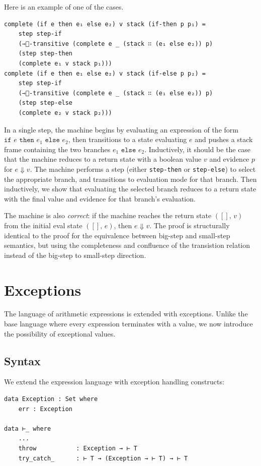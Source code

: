 Here is an example of one of the cases.
\begin{verbatim}
complete (if e then e₁ else e₂) v stack (if-then p p₁) =
    step step-𝚒𝚏
    (⇾⃰-transitive (complete e _ (stack ∷ (e₁ 𝚎𝚕𝚜𝚎 e₂)) p)
    (step step-𝚝𝚑𝚎𝚗
    (complete e₁ v stack p₁)))
complete (if e then e₁ else e₂) v stack (if-else p p₂) =
    step step-𝚒𝚏
    (⇾⃰-transitive (complete e _ (stack ∷ (e₁ 𝚎𝚕𝚜𝚎 e₂)) p)
    (step step-𝚎𝚕𝚜𝚎
    (complete e₂ v stack p₂)))
\end{verbatim}

In a single step, the machine begins by evaluating an expression of the form $\texttt{if } e \texttt{ then } e_1 \texttt{ else } e_2$, then transitions to a state evaluating $e$ and pushes a stack frame containing the two branches $e_1 \texttt{ else } e_2$.
Inductively, it should be the case that the machine reduces to a return state with a boolean value $v$ and evidence $p$ for $e \Downarrow v$.
The machine performs a step (either \texttt{step-then} or \texttt{step-else}) to select the appropriate branch, and transitions to evaluation mode for that branch.
Then inductively, we show that evaluating the selected branch reduces to a return state with the final value and evidence for that branch's evaluation.

The machine is also \textit{correct}: if the machine reaches the return state $(\mathtt{[]},\,v)$ from the initial eval state $(\mathtt{[]},\,e)$, then $e \Downarrow v$.
The proof is structurally identical to the proof for the equivalence between big-step and small-step semantics, but using the completeness and confluence of the transistion relation instead of the big-step to small-step direction.


\chapter{Exceptions}
\label{chap:exceptions}

The language of arithmetic expressions is extended with exceptions. Unlike the base language where every expression terminates with a value, we now introduce the possibility of exceptional values.

\section{Syntax}

We extend the expression language with exception handling constructs:
\begin{verbatim}
data Exception : Set where
    err : Exception

data ⊢_ where
    ...
    throw           : Exception → ⊢ T
    try_catch_      : ⊢ T → (Exception → ⊢ T) → ⊢ T
\end{verbatim}

